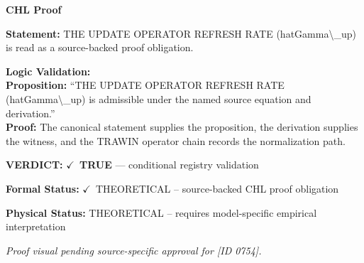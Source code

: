 \vspace{0.45em}
\noindent\textbf{CHL Proof}\par
\textbf{Statement:} THE UPDATE OPERATOR REFRESH RATE (hatGamma\textbackslash{}\_up) is read as a source-backed proof obligation.

\textbf{Logic Validation:}\\
\textbf{Proposition:} ``THE UPDATE OPERATOR REFRESH RATE (hatGamma\textbackslash{}\_up) is admissible under the named source equation and derivation.''\\
\textbf{Proof:} The canonical statement supplies the proposition, the derivation supplies the witness, and the TRAWIN operator chain records the normalization path.

\textbf{VERDICT:} \ensuremath{\checkmark}\ \textbf{TRUE} --- conditional registry validation

\textbf{Formal Status:} \ensuremath{\checkmark}\ THEORETICAL -- source-backed CHL proof obligation

\textbf{Physical Status:} THEORETICAL -- requires model-specific empirical interpretation
\par\vspace{0.45em}
\par
\vfill
\begingroup\footnotesize\itshape
Proof visual pending source-specific approval for [ID 0754].
\par\endgroup
\vfill
\endgroup
\endgroup
